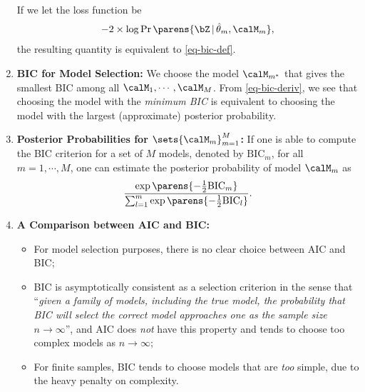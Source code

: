 \documentclass[12pt]{article}
\begin{document}
\begin{enumerate}[label=\textbf{\arabic*.}]
	If we let the loss function be 
	\begin{align*}
		-2 \times \log \Pr \parens{\bZ \,\vert\, \hat{\theta}_m, \calM_m}, 
	\end{align*}
	the resulting quantity is equivalent to \eqref{eq-bic-def}. 
	
	\item \textbf{BIC for Model Selection:} We choose the model $\calM_{m^*}$ that gives the smallest BIC among all $\calM_1, \cdots, \calM_M$. \newline From \eqref{eq-bic-deriv}, we see that choosing the model with the \textit{minimum BIC} is equivalent to choosing the model with the largest (approximate) posterior probability. 
	
	\item \textbf{Posterior Probabilities for $\sets{\calM_m}_{m=1}^M$:} If one is able to compute the BIC criterion for a set of $M$ models, denoted by $\mathrm{BIC}_m$, for all $ m = 1, \cdots, M$, one can estimate the posterior probability of model $\calM_m$ as 
	\begin{align*}
		\frac{\exp \parens{- \frac{1}{2} \mathrm{BIC}_m}}{\sum_{l=1}^m \exp \parens{-\frac{1}{2} \mathrm{BIC}_l}}. 
	\end{align*}
	
	\item \textbf{A Comparison between AIC and BIC:} 
	\begin{itemize}
		\item For model selection purposes, there is no clear choice between AIC and BIC; 
		\item BIC is asymptotically consistent as a selection criterion in the sense that ``\textit{given a family of models, including the true model, the probability that BIC will select the correct model approaches one as the sample size $n \to \infty$}'', and AIC does \emph{not} have this property and tends to choose too complex models as $n \to \infty$; 
		\item For finite samples, BIC tends to choose models that are \emph{too} simple, due to the heavy penalty on complexity. 
	\end{itemize}
\end{enumerate}
\end{document}
